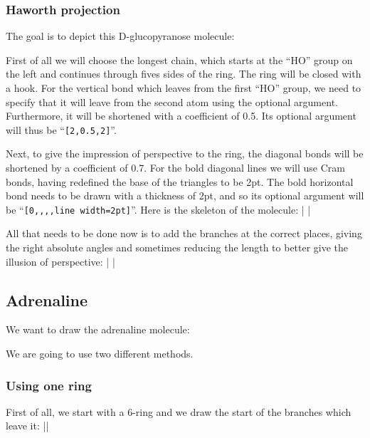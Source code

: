 \documentclass[10pt]{article}
\begin{document}
\subsubsection{Haworth projection}
The goal is to depict this D-glucopyranose molecule:
{\setcrambond{2pt}{}{}
}

First of all we will choose the longest chain, which starts at the ``HO'' group on the left and continues through fives sides of the ring. The ring will be closed with a hook. For the vertical bond which leaves from the first ``HO'' group, we need to specify that it will leave from the second atom using the optional argument. Furthermore, it will be shortened with a coefficient of 0.5. Its optional argument will thus be ``\verb/[2,0.5,2]/''.

Next, to give the impression of perspective to the ring, the diagonal bonds will be shortened by a coefficient of 0.7. For the bold diagonal lines we will use Cram bonds, having redefined the base of the triangles to be 2pt. The bold horizontal bond needs to be drawn with a thickness of 2pt, and so its optional argument will be ``\verb/[0,,,,line width=2pt]/''. Here is the skeleton of the molecule\idx*{\setcrambond}:
|\setcrambond{2pt}{}{}
|

All that needs to be done now is to add the branches at the correct places, giving the right absolute angles and sometimes reducing the length to better give the illusion of perspective\idx*{\setcrambond}:
|\setcrambond{2pt}{}{}
|

\subsection{Adrenaline}
We want to draw the adrenaline molecule:

We are going to use two different methods.

\subsubsection{Using one ring}
First of all, we start with a 6-ring and we draw the start of the branches which leave it:
||
\end{document}
